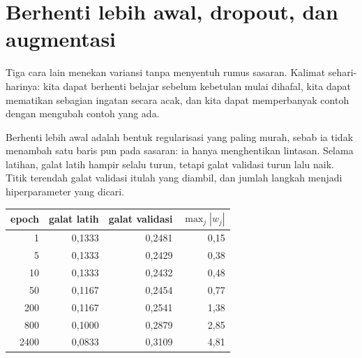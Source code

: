 \section{Berhenti lebih awal, dropout, dan augmentasi}

Tiga cara lain menekan variansi tanpa menyentuh rumus sasaran. Kalimat sehari-harinya:
kita dapat berhenti belajar sebelum kebetulan mulai dihafal, kita dapat mematikan
sebagian ingatan secara acak, dan kita dapat memperbanyak contoh dengan mengubah contoh
yang ada.

Berhenti lebih awal adalah bentuk regularisasi yang paling murah, sebab ia tidak
menambah satu baris pun pada sasaran: ia hanya menghentikan lintasan. Selama latihan,
galat latih hampir selalu turun, tetapi galat validasi turun lalu naik. Titik terendah
galat validasi itulah yang diambil, dan jumlah langkah menjadi hiperparameter yang
dicari.

\begin{center}
\small
\begin{tabular}{rrrr}
\hline
epoch & galat latih & galat validasi & $\max_j|w_j|$ \\
\hline
1    & 0,1333 & 0,2481 & 0,15 \\
5    & 0,1333 & 0,2429 & 0,38 \\
10   & 0,1333 & 0,2432 & 0,48 \\
50   & 0,1167 & 0,2454 & 0,77 \\
200  & 0,1167 & 0,2541 & 1,38 \\
800  & 0,1000 & 0,2879 & 2,85 \\
2400 & 0,0833 & 0,3109 & 4,81 \\
\hline
\end{tabular}
\end{center}

